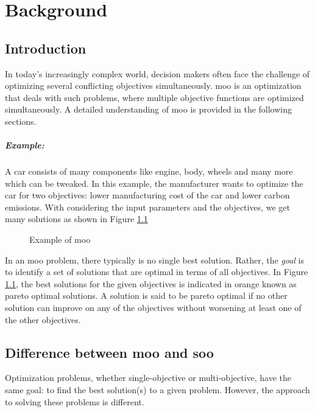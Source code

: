 \chapter{Background}

\section{Introduction} \label{what is moo}
In today's increasingly complex world, decision makers often face the challenge of optimizing several conflicting objectives simultaneously. \acrfull{moo} 
is an optimization that deals with such problems, where multiple objective functions are optimized simultaneously. A detailed understanding of \acrshort{moo} 
is provided in the following sections.

\paragraph{Example:}
A car consists of many components like engine, body, wheels and many more which can be
tweaked. In this example, the manufacturer wants to optimize the car for two objectives: lower manufacturing cost of the car and lower carbon emissions. With 
considering the input parameters and the objectives, we get many solutions as shown in Figure \ref{moo}

\begin{figure}[!h]
	\begin{center}
		
	\end{center}
    \caption{Example of \acrshort{moo}}
    \label{moo}
\end{figure}
In an \acrshort{moo} problem, there typically is no single best solution. Rather, the \textit{goal} is to identify a set of solutions that are optimal in terms 
of all objectives. In Figure \ref{moo}, the best solutions for the given objectives is indicated in orange known as pareto optimal solutions. A solution is said 
to be pareto optimal if no other solution can improve on any of the objectives without worsening at least one of the other objectives\cite{Benson2009}.

\section{Difference between \acrlong{moo} and \acrlong{soo}}
Optimization problems, whether single-objective or multi-objective, have the same goal: to find the best solution(s) to a given problem. However, the approach
to solving these problems is different. 

